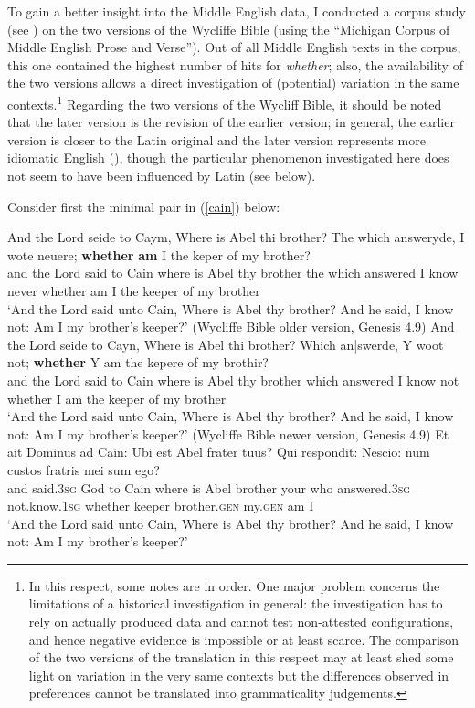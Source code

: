 To gain a better insight into the Middle English data, I conducted a corpus study (see \citealt{bacskaiatkari2019me}) on the two versions of the Wycliffe Bible (using the ``Michigan Corpus of Middle English Prose and Verse''). Out of all Middle English texts in the corpus, this one contained the highest number of hits for \textit{whether}; also, the availability of the two versions allows a direct investigation of (potential) variation in the same contexts.\footnote{In this respect, some notes are in order. One major problem concerns the limitations of a historical investigation in general: the investigation has to rely on actually produced data and cannot test non-attested configurations, and hence negative evidence is impossible or at least scarce. The comparison of the two versions of the translation in this respect may at least shed some light on variation in the very same contexts but the differences observed in preferences cannot be translated into grammaticality judgements.} Regarding the two versions of the Wycliff Bible, it should be noted that the later version is the revision of the earlier version; in general, the earlier version is closer to the Latin original and the later version represents more idiomatic English (\citealt{bruce1984}), though the particular phenomenon investigated here does not seem to have been influenced by Latin (see below). 

Consider first the minimal pair in (\ref{cain}) below:

\ea \label{cain}
\ea \gll And the Lord seide to Caym, Where is Abel thi brother? The which answeryde, I wote neuere; \textbf{whether} \textbf{am} I the keper of my brother?\\
and the Lord said to Cain where is Abel thy brother the which answered I know never whether am I the keeper of my brother\\
\glt `And the Lord said unto Cain, Where is Abel thy brother? And he said, I know not: Am I my brother's keeper?'
(Wycliffe Bible older version, Genesis 4.9)
\ex \gll And the Lord seide to Cayn, Where is Abel thi brother? Which an|swerde, Y woot not; \textbf{whether} Y am the kepere of my brothir?\\
and the Lord said to Cain where is Abel thy brother which answered I know not whether I am the keeper of my brother\\
\glt `And the Lord said unto Cain, Where is Abel thy brother? And he said, I know not: Am I my brother's keeper?'
(Wycliffe Bible newer version, Genesis 4.9)
\ex \gll Et ait Dominus ad Cain: Ubi est Abel frater tuus? Qui respondit: Nescio: num custos fratris mei sum ego?\\
and said.\textsc{3sg} God to Cain	where is Abel brother your who answered.\textsc{3sg} not.know.\textsc{1sg} whether keeper brother.\textsc{gen} my.\textsc{gen} am I\\
\glt `And the Lord said unto Cain, Where is Abel thy brother? And he said, I know not: Am I my brother's keeper?'
\z
\z


